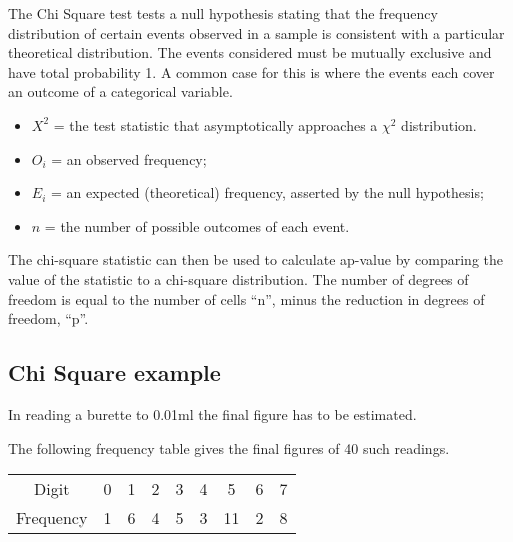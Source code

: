  



The Chi Square test tests a null hypothesis stating that the frequency distribution of certain events observed in a sample is consistent with a particular theoretical distribution. The events considered must be mutually exclusive and have total probability 1. A common case for this is where the events each cover an outcome of a categorical variable.

 

\begin{itemize}

\item $X^2$ = the test statistic that asymptotically approaches a $\chi^2$ distribution.

\item $O_i$ = an observed frequency;

\item $E_i$ = an expected (theoretical) frequency, asserted by the null hypothesis;

\item $n $  = the number of possible outcomes of each event.

\end{itemize}

 

The chi-square statistic can then be used to calculate ap-value by comparing the value of the statistic to a chi-square distribution. The number of degrees of freedom is equal to the number of cells ``n'', minus the reduction in degrees of freedom, ``p''.

\subsection{Chi Square example}

In reading a burette to 0.01ml the final figure has to be estimated.

The following frequency table gives the final figures of 40 such readings.

 

\begin{tabular}{|c|c|c|c|c|c|c|c|c|}

\hline

Digit & 0 & 1 & 2 & 3 & 4 & 5 & 6 & 7 \\

Frequency& 1 & 6 & 4 & 5 & 3 & 11 & 2 & 8 \\

\hline

\end{tabular}

